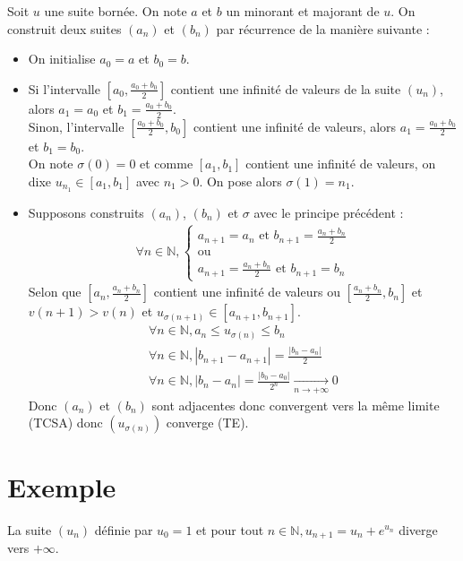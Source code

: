 \documentclass[../main.tex]{subfiles}
\begin{document}
Soit $u$ une suite bornée. On note $a$ et $b$ un minorant et majorant de $u$. On construit deux suites $(a_n)$ et $(b_n)$ par récurrence de la manière suivante : 
\begin{itemize}
    \item On initialise $a_0 = a$ et $b_0 = b$. 
    
    \item Si l'intervalle $\left[ a_0, \frac{a_0 + b_0}{2} \right]$ contient une infinité de valeurs de la suite $(u_n)$, alors $a_1 = a_0$ et $b_1 = \frac{a_0 + b_0}{2}$. \\
    Sinon, l'intervalle $\left[ \frac{a_0 + b_0}{2}, b_0 \right]$ contient une infinité de valeurs, alors $a_1 = \frac{a_0 + b_0}{2}$ et $b_1 = b_0$. \\
    On note $\sigma(0) = 0$ et comme $[a_1, b_1]$ contient une infinité de valeurs, on dixe $u_{n_1}  \in [a_1, b_1]$ avec $n_1 > 0$. On pose alors $\sigma(1) = n_1$. 

    \item Supposons construits $(a_n)$, $(b_n)$ et $\sigma$ avec le principe précédent : 
    \begin{align*}
        \forall n\in \mathbb{N}, \begin{cases}
            a_{n+1} = a_n \text{ et } b_{n+1} = \frac{a_n + b_n}{2} \\
            \text{ou} \\
            a_{n+1} = \frac{a_n + b_n}{2} \text{ et } b_{n+1} = b_n
        \end{cases}
    \end{align*}
    Selon que $\left[a_n, \frac{a_n + b_n}{2}\right]$ contient une infinité de valeurs ou $\left[ \frac{a_n + b_n}{2}, b_n \right]$ et $v(n+1) > v(n)$ et $u_{\sigma(n+1)} \in [a_{n+1}, b_{n+1}]$. 
    \begin{align*}
        \forall n \in \mathbb{N}, a_n \leq u_{\sigma(n)} \leq b_n \\
        \forall n \in \mathbb{N}, |b_{n+1} - a_{n+1}| = \frac{|b_n - a_n|}{2} \\
        \forall n \in \mathbb{N}, |b_n - a_n| = \frac{|b_0 - a_0|}{2^n} \underset{n \to +\infty}{\longrightarrow} 0
    \end{align*}
    Donc $(a_n)$ et $(b_n)$ sont adjacentes donc convergent vers la même limite (TCSA) donc $(u_{\sigma(n)})$ converge (TE). 
\end{itemize}

\setcounter{section}{62}
\section{Exemple}
\begin{tcolorbox}[title=Exemple 14.63, title filled=false, colframe=darkgreen, colback=darkgreen!10!white]
    La suite $(u_n)$ définie par $u_0 = 1$ et pour tout $n \in \mathbb{N}, u_{n+1} = u_n + e^{u_n}$ diverge vers $+\infty$. 
\end{tcolorbox}
\end{document}
